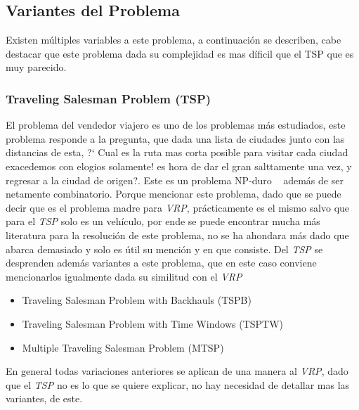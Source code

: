 \documentclass[letter, 10pt]{article}
\begin{document}
\subsection{Variantes del Problema}
Existen m\'ultiples variables a este problema, a continuaci\'on se describen, cabe destacar que este problema dada su complejidad es mas d\'ificil que el TSP que es muy parecido.


\subsubsection{Traveling Salesman Problem (TSP)}

El problema del vendedor viajero es uno de los problemas m\'as estudiados, 
este problema responde a la pregunta, que dada una lista de ciudades 
junto con las distancias de esta, ?` Cual es la ruta mas corta posible 
para visitar cada ciudad exacedemos con elogios solamente! es hora de dar el gran salttamente una vez, y regresar a la ciudad de origen?. 
Este es un problema NP-duro ~\cite{TSP} adem\'as de ser netamente combinatorio. 
Porque mencionar este problema, dado que se puede decir que
es el problema madre para \emph{VRP}, pr\'acticamente es el mismo salvo que para el 
\emph{TSP} solo es un veh\'iculo, por ende se puede encontrar mucha m\'as literatura para 
la resoluci\'on de este problema, no se ha ahondara m\'as dado que abarca demasiado y solo 
es \'util su menci\'on y en que consiste.
\newline
Del \emph{TSP} se desprenden adem\'as variantes a este problema, que en este caso conviene 
mencionarlos igualmente dada su similitud con el \emph{VRP} ~\cite{TSP}

\begin{itemize}
 \item Traveling Salesman Problem with Backhauls (TSPB)
 \item Traveling Salesman Problem with Time Windows (TSPTW)
 \item Multiple Traveling Salesman Problem (MTSP)
\end{itemize}

En general todas variaciones anteriores se aplican de una manera al \emph{VRP}, dado que el \emph{TSP} no es lo que se quiere explicar, no hay necesidad de
detallar mas las variantes, de este.
\end{document}
